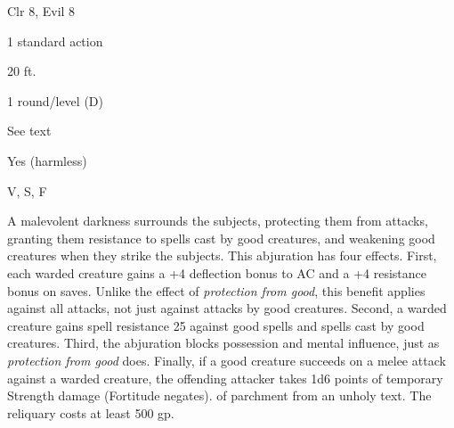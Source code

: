 
\begin{description*}
\item[Level:] Clr 8, Evil 8
\item[Casting Time:] 1 standard action
\item[Range:] 20 ft.
\item[Duration:] 1 round/level (D)
\item[Saving Throw:] See text
\item[Spell Resistance:] Yes (harmless)
\item[Components:] V, S, F
\end{description*}

A malevolent darkness surrounds the subjects, protecting them from attacks, granting
them resistance to spells cast by good creatures, and weakening good creatures
when they strike the subjects. This abjuration has four effects.
First, each warded creature gains a +4 deflection bonus to AC and a +4 resistance
bonus on saves. Unlike the effect of \textit{protection from good}, this benefit
applies against all attacks, not just against attacks by good creatures.
Second, a warded creature gains spell resistance 25 against good spells and spells
cast by good creatures.
Third, the abjuration blocks possession and mental influence, just as \textit{protection
from good} does.
Finally, if a good creature succeeds on a melee attack against a warded creature,
the offending attacker takes 1d6 points of temporary Strength damage (Fortitude
negates).
of parchment from an unholy text. The reliquary costs at least 500 gp.